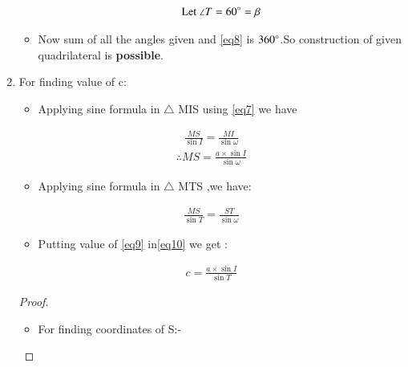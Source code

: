 \documentclass[journal,12pt,twocolumn]{IEEEtran}
\begin{document}
\begin{enumerate}
\begin{itemize}
\begin{align}
\text{Let }\angle T = 60\degree =\beta \label{eq8}
\end{align}
\item Now sum of all the angles given and \eqref{eq8} is $360\degree$.So construction of given quadrilateral is \textbf{possible}.
\end{itemize}
\item For finding value of c:
\begin{itemize}
\item Applying sine formula in $\triangle$ MIS using \eqref{eq7} we have
\end{itemize}
\begin{align}
\frac{MS}{\sin I}=\frac{MI}{\sin \omega }
\end{align}
\begin{align}
\therefore MS=\frac{a\times \sin I}{\sin \omega} \label{eq9}
\end{align}
\begin{itemize}
\item Applying sine formula in $\triangle$ MTS ,we have:
\end{itemize}
\begin{align}
  \frac{MS}{\sin T}=\frac{ST}{\sin \omega} \label{eq10}  
\end{align}
\begin{itemize}
\item Putting value of \eqref{eq9} in\eqref{eq10}
we get :
\end{itemize}
\begin{align}
c=\frac{a\times \sin I}{\sin T} \label{eq11}
\end{align}
\begin{proof}
\begin{itemize}
\item For finding coordinates of S:-

\end{itemize}
\end{proof}
\end{enumerate}
\end{document}
